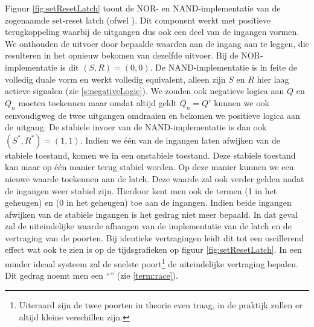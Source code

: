 Figuur \ref{fig:setResetLatch} toont de NOR- en NAND-implementatie van de zogenaamde set-reset latch (ofwel ). Dit component werkt met positieve terugkoppeling waarbij de uitgangen dus ook een deel van de ingangen vormen. We onthouden de uitvoer door bepaalde waarden aan de ingang aan te leggen, die resulteren in het opnieuw bekomen van dezelfde uitvoer. Bij de NOR-implementatie is dit $\left(S,R\right)=\left(0,0\right)$. De NAND-implementatie is in feite de volledig duale vorm en werkt volledig equivalent, alleen zijn $S$ en $R$ hier laag actieve signalen (zie \ref{s:negativeLogic}). We zouden ook negatieve logica aan $Q$ en $Q_n$ moeten toekennen maar omdat altijd geldt $Q_n=Q'$ kunnen we ook eenvoudigweg de twee uitgangen omdraaien en bekomen we positieve logica aan de uitgang. De stabiele invoer van de NAND-implementatie is dan ook $\left(S^*,R^*\right)=\left(1,1\right)$. Indien we \'e\'en van de ingangen laten afwijken van de stabiele toestand, komen we in een onstabiele toestand. Deze stabiele toestand kan maar op \'e\'en manier terug stabiel worden. Op deze manier kunnen we een nieuwe waarde toekennen aan de latch. Deze waarde zal ook verder gelden nadat de ingangen weer stabiel zijn. Hierdoor kent men ook de termen  (1 in het geheugen) en  (0 in het geheugen) toe aan de ingangen. Indien beide ingangen afwijken van de stabiele ingangen is het gedrag niet meer bepaald. In dat geval zal de uiteindelijke waarde afhangen van de implementatie van de latch en de vertraging van de poorten. Bij identieke vertragingen leidt dit tot een oscillerend effect wat ook te zien is op de tijdsgrafieken op figuur \ref{fig:setResetLatch}. In een minder ideaal systeem zal de snelste poort\footnote{Uiteraard zijn de twee poorten in theorie even traag, in de praktijk zullen er altijd kleine verschillen zijn.} de uiteindelijke vertraging bepalen. Dit gedrag noemt men een ``'' (zie \ref{term:race}).
